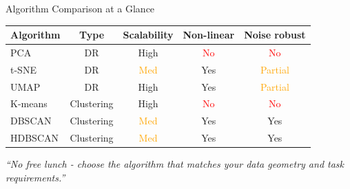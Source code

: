 \documentclass[aspectratio=169]{beamer}
\begin{document}
\begin{frame}{Algorithm Comparison at a Glance}
  \centering\small
  \begin{tabular}{lcccc}
    \toprule
    \textbf{Algorithm} & \textbf{Type} & \textbf{Scalability} & \textbf{Non-linear} & \textbf{Noise robust} \\
    \midrule
    PCA     & DR          & \textcolor{green!60!black}{High}   & \textcolor{red}{No}  & \textcolor{red}{No}  \\
    t-SNE   & DR          & \textcolor{orange}{Med}            & \textcolor{green!60!black}{Yes} & \textcolor{orange}{Partial} \\
    UMAP    & DR          & \textcolor{green!60!black}{High}   & \textcolor{green!60!black}{Yes} & \textcolor{orange}{Partial} \\
    \midrule
    K-means     & Clustering  & \textcolor{green!60!black}{High}   & \textcolor{red}{No}  & \textcolor{red}{No}  \\
    DBSCAN      & Clustering  & \textcolor{orange}{Med}            & \textcolor{green!60!black}{Yes} & \textcolor{green!60!black}{Yes} \\
    HDBSCAN     & Clustering  & \textcolor{orange}{Med}            & \textcolor{green!60!black}{Yes} & \textcolor{green!60!black}{Yes} \\
    \bottomrule
  \end{tabular}

  \vspace{0.8cm}
  \begin{block}{}
    \centering\itshape
    ``No free lunch - choose the algorithm that matches your data geometry and task requirements.''
  \end{block}
\end{frame}
\end{document}
